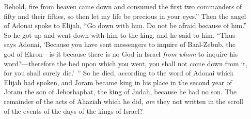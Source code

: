 \begin{biblechapter}
\verse Behold, fire from heaven came down and consumed the first two commanders of fifty and their fifties, so then let my life be precious in your eyes.”
\verse Then the angel of Adonai spoke to Elijah, “Go down with him. Do not be afraid because of him.” So he got up and went down with him to the king,
\verse and he said to him, “Thus says Adonai, ‘Because you have sent messengers to inquire of Baal-Zebub, the god of Ekron—is it because there is no God in Israel \textit{from whom} to inquire his word?—therefore the bed upon which you went, you shall not come down from it, for you shall surely die.’ ”
 So he died, according to the word of Adonai which Elijah had spoken, and Joram became king in his place in the second year of Joram the son of Jehoshaphat, the king of Judah, because he had no son.
\verse The remainder of the acts of Ahaziah which he did, \textit{are} they not written in the scroll of the events of the days of the kings of Israel?
\end{biblechapter}

